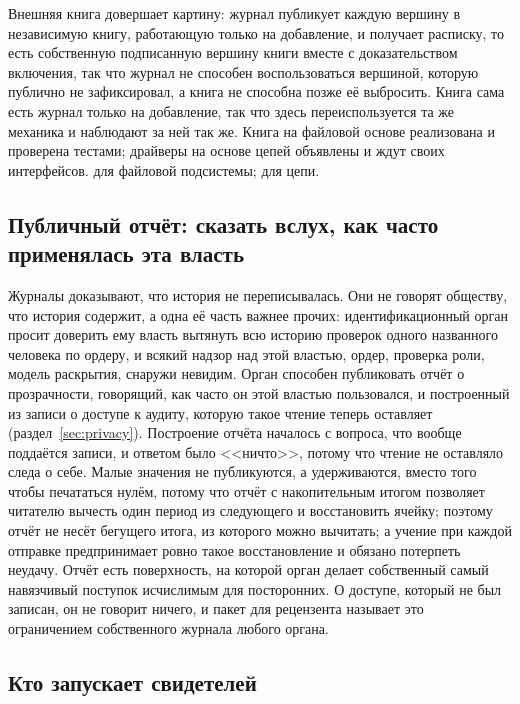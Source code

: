 Внешняя книга довершает картину: журнал публикует каждую вершину в независимую книгу, работающую
только на добавление, и получает расписку, то есть собственную подписанную вершину книги вместе с
доказательством включения, так что журнал не способен воспользоваться вершиной, которую публично не
зафиксировал, а книга не способна позже её выбросить. Книга сама есть журнал только на добавление,
так что здесь переиспользуется та же механика и наблюдают за ней так же. Книга на файловой основе
реализована и проверена тестами; драйверы на основе цепей объявлены и ждут своих интерфейсов.
\sImplMark{} для файловой подсистемы; \sFut{} для цепи.

\subsection{Публичный отчёт: сказать вслух, как часто применялась эта власть}

Журналы доказывают, что история не переписывалась. Они не говорят обществу, что история содержит, а
одна её часть важнее прочих: идентификационный орган просит доверить ему власть вытянуть всю
историю проверок одного названного человека по ордеру, и всякий надзор над этой властью, ордер,
проверка роли, модель раскрытия, снаружи невидим. Орган способен
публиковать отчёт о прозрачности, говорящий, как часто он этой властью пользовался, и построенный
из записи о доступе к аудиту, которую такое чтение теперь оставляет (раздел~\ref{sec:privacy}).
Построение отчёта началось с вопроса, что вообще поддаётся записи, и ответом было <<ничто>>,
потому что чтение не оставляло следа о себе. Малые значения не публикуются, а удерживаются, вместо
того чтобы печататься нулём, потому что отчёт с накопительным итогом позволяет читателю вычесть
один период из следующего и восстановить ячейку; поэтому отчёт не несёт бегущего итога, из которого
можно вычитать; а учение при каждой отправке предпринимает ровно такое восстановление и обязано
потерпеть неудачу. Отчёт есть поверхность, на которой орган делает собственный самый навязчивый
поступок исчислимым для посторонних. О доступе, который не был записан, он не говорит ничего, и
пакет для рецензента называет это ограничением собственного журнала любого органа. \sImpl

\subsection{Кто запускает свидетелей}

